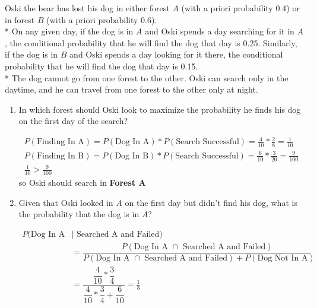\question Oski the bear has lost his dog in either forest $A$ (with a 
priori probability 0.4) or in forest $B$ (with a priori probability 0.6). \\*                   
On any given day, if the dog is in $A$ and Oski spends a day searching 
for it in $A$, the conditional probability that he will find the dog 
that day is 0.25. Similarly, if the dog is in $B$ and Oski spends a day 
looking for it there, the conditional probability that he will find the 
dog that day is 0.15. \\*               
The dog cannot go from one forest to the other. Oski can search only in 
the daytime, and he can travel from one forest to the other only at night.

\begin{enumerate}[label=(\alph*)]
\item  In which forest should Oski look to maximize the probability he 
finds his dog on the first day of the search?     
\begin{solution}[3cm]
\begin{align*}
P(\text{Finding In A}) = P(\text{Dog In A}) * P(\text{Search Successful}) 
= \frac{4}{10} *  \frac{2}{8} = \frac{1}{10} \\
    P(\text{Finding In B}) = P(\text{Dog In B}) * 
    P(\text{Search Successful}) = \frac{6}{10} 
    * \frac{3}{20} = \frac{9}{100}\\
    \frac{1}{10} > \frac{9}{100}
\end{align*} so Oski should search in \textbf{Forest A}
\end{solution}

\item  Given that Oski looked in $A$ on the first day but didn’t find 
his dog, what is the probability that the dog is in $A$?
\begin{solution}[2cm]
\begin{align*}
P(\text{Dog In A } &\mid \text{ Searched A and Failed}) 
\\ &=  \dfrac{P(\text{Dog In A } \cap \text{ Searched
A and Failed})}{P(\text{Dog In A } \cap \text{ Searched A and Failed}) + 
P(\text{Dog Not In A})} \\ 
&= \dfrac{\dfrac{4}{10} * \dfrac{3}{4} }{\dfrac{4}{10} * \dfrac{3}{4} + 
\dfrac{6}{10}}
                    = \frac{1}{3}    
\end{align*}
\end{solution}


\end{enumerate}
